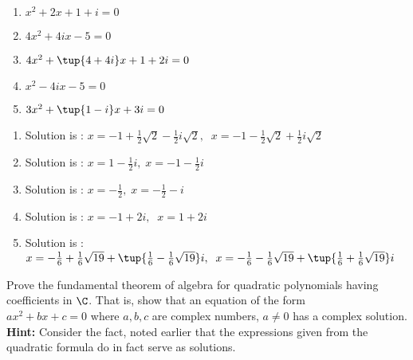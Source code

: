 \begin{enumialphparenastyle}
\begin{ex}
\begin{enumerate}
\item $x^{2}+2x+1+i=0$

\item $4x^{2}+4ix-5=0$

\item $4x^{2}+\tup{4+4i} x+1+2i=0$

\item $x^{2}-4ix-5=0$

\item $3x^{2}+\tup{1-i} x+3i=0$
\end{enumerate}
\begin{sol}
\begin{enumerate}
\item Solution is : $x=-1+\frac{1}{2}\sqrt{2}-\frac{1}{2}i
\sqrt{2},\;\;x=-1-\frac{1}{2}\sqrt{2}+\frac{1}{2}i\sqrt{2}$
\item Solution is : $x=1-\frac{1}{2}i,\;x=-1-\frac{1}{2}i$
\item Solution is : $x=-\frac{1}{2},\;x=-\frac{1}{2}-i$
\item Solution is : $x=-1+2i,\;\;x=1+2i$
\item Solution is : $x=-\frac{1}{6}+\frac{1}{6}\sqrt{19}+\tup{\frac{1}{6}-\frac{1}{6}\sqrt{19}} i,\;\;x=-\frac{1}{6}-\frac{1}{6}\sqrt{19}+\tup{\frac{1}{6}+\frac{1}{6}\sqrt{19}}i$
\end{enumerate}
\end{sol}
\end{ex}



\begin{ex} \label{exercomplex3}Prove the fundamental theorem of algebra for
quadratic polynomials having coefficients in $\C$. That is, show
that an equation of the form \\ $ax^{2}+bx+c=0$ where $a,b,c$ are complex
numbers, $a\neq 0$ has a complex solution. \textbf{Hint: }Consider the fact,
noted earlier that the expressions given from the quadratic formula do in
fact serve as solutions. 
\end{ex}

\end{enumialphparenastyle}